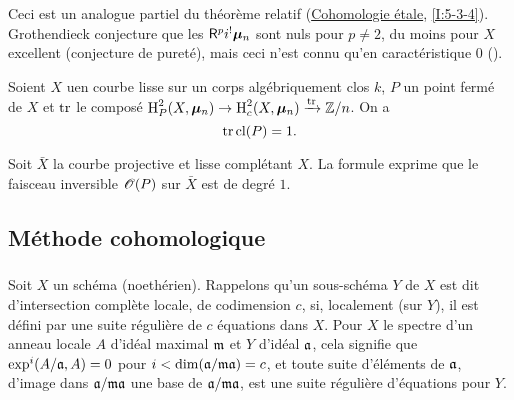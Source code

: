 Ceci est un analogue partiel du théorème relatif 
(\hyperref[I]{Cohomologie étale}, \ref{I:5-3-4}). Grothendieck conjecture 
que les $\mathsf{R}^p i^! {\bm\mu}_n$ sont nuls pour $p\ne 2$, du moins pour $X$ excellent 
(conjecture de pureté), mais ceci n'est connu qu'en caractéristique $0$ 
(\cite[XIX]{sga4}). 




\begin{theorem}\label{IV:2-1-5}
Soient $X$ uen courbe lisse sur un corps algébriquement clos $k$, $P$ un 
point fermé de $X$ et $\operatorname{tr}$ le composé $\operatorname{H}_P^2(X,{\bm\mu}_n) \to \operatorname{H}_c^2(X,{\bm\mu}_n) \xrightarrow{\operatorname{tr}} \mathbb{Z}/n$. On a 
\[
  \operatorname{tr} \operatorname{cl}(P) = 1 \text{.}
\]
\end{theorem}

Soit $\bar X$ la courbe projective et lisse complétant $X$. La formule 
exprime que le faisceau inversible $\mathscr{O}(P)$ sur $\bar X$ est de degré $1$. 










\subsection{Méthode cohomologique}\label{IV:2-2}





\subsubsection{}\label{IV:2-2-1}

Soit $X$ un schéma (noethérien). Rappelons qu'un sous-schéma $Y$ de $X$ 
est dit d'intersection complète locale, de codimension $c$, si, localement 
(sur $Y$), il est défini par une suite régulière de $c$ équations dans 
$X$. Pour $X$ le spectre d'un anneau locale $A$ d'idéal maximal $\mathfrak{m}$ et 
$Y$ d'idéal $\mathfrak{a}$, cela signifie que $\exp^i(A/\mathfrak{a},A) = 0$ pour 
$i<\dim(\mathfrak{a}/\mathfrak{m}\mathfrak{a})=c$, et toute suite d'éléments de $\mathfrak{a}$, d'image dans 
$\mathfrak{a}/\mathfrak{m}\mathfrak{a}$ une base de $\mathfrak{a}/\mathfrak{m}\mathfrak{a}$, est une suite régulière 
d'équations pour $Y$. 





\subsubsection{}\label{IV:2-2-2}


